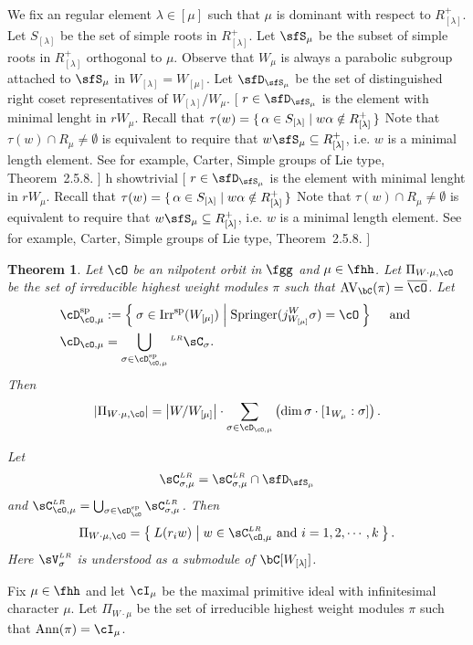 \documentclass[12pt,a4paper]{amsart}
\newcommand{\trivial}[2][]{\if\relax\detokenize{#1}\relax
  {%
      \color{orange} \vspace{0em} $[$  #2 $]$
      \color{black}
  }
  \else
\ifx#1h
\ifcsname showtrivial\endcsname
{%
    \color{orange} \vspace{0em}  $[$ #2 $]$
    \color{black}
}
\fi
\else {\red Wrong argument!} \fi
\fi
}
\newcommand{\AVC}{\mathrm{AV}_\bC}
\def\abs#1{\left|{#1}\right|}
\DeclareMathOperator{\Ann}{Ann}
\numberwithin{equation}{section}
\newtheorem{thm}{Theorem}[section]
\theoremstyle{remark}
\def\Irrsp{\mathrm{Irr}^{\text{sp}}}
\def\Wlam{W_{[\lambda]}}
\def\CLR{{\sC}^{\scriptscriptstyle LR}}
\def\LRC{{}^{\scriptscriptstyle LR}\sC}
\def\VLR{{\sV}^{\scriptscriptstyle LR}}
\def\Spr{\mathrm{Springer}}
\begin{document}
We fix an regular element $\lambda\in [\mu]$ such that $\mu$ is dominant with
respect to $R^{+}_{[\lambda]}$. Let $S_{[\lambda]}$ be the set of simple roots
in $R^{+}_{[\lambda]}$. Let $\sfS_{\mu}$ be the subset of simple roots in
$R^{+}_{[\lambda]}$ orthogonal to $\mu$. Observe that $W_{\mu}$ is always a
parabolic subgroup attached to $\sfS_{\mu}$ in $W_{[\lambda]} = W_{[\mu]}$. Let
$\sfD_{\sfS_{\mu}}$ be the set of distinguished right coset representatives of
$W_{[\lambda]}/W_{\mu}$.
\trivial[]{
  $r\in \sfD_{\sfS_{\mu}}$ is the element with minimal lenght in $rW_{\mu}$.
  Recall that $\tau(w) = \set{\alpha\in S_{[\lambda]}|w\alpha\notin R^{+}_{[\lambda]} }$
  Note that
  $\tau(w)\cap R_{\mu}\neq \emptyset$ is equivalent to require that
  $w \sfS_{\mu}\subseteq R^{+}_{[\lambda]}$, i.e. $w$ is a minimal length
  element. See for example, Carter, Simple groups of Lie type, Theorem~2.5.8.
}

\begin{thm}
  Let $\cO$ be an nilpotent orbit in $\fgg$ and $\mu\in \fhh$.
  Let $\Pi_{W\cdot \mu, \cO}$ be the set of irreducible highest
  weight modules $\pi$ such that  $\AVC(\pi) = \bcO$.
  Let
  \begin{equation}\label{eq:DC.O.mu}
    \begin{split}
      \Dsp_{\cO,\mu} &:= \Set{\sigma\in \Irrsp(W_{[\mu]})|\Spr(j_{W_{[\mu]}}^{W}\sigma) = \cO}\quad \text{
        and }\\
      \cD_{\cO,\mu} &= \bigcup_{\sigma\in \Dsp_{\cO,\mu}} \LRC_{\sigma}.
    \end{split}
  \end{equation}
  Then
  \[
    \abs{\Pi_{W\cdot\mu,\cO}} = \abs{W/W_{[\mu]}}\cdot \sum_{\sigma\in \cD_{\cO,\mu}}
    \left(\dim \sigma \cdot [1_{W_{\mu}}:\sigma]\right).
  \]


  Let
  \[
  \CLR_{\sigma,\mu} = \CLR_{\sigma,\mu}\cap \sfD_{\sfS_{\mu}}
  \]
  and $\CLR_{\cO,\mu} = \bigcup_{\sigma\in \Dsp_{\cO}} \CLR_{\sigma,\mu}$.
  Then
  \[
  \Pi_{W\cdot\mu,\cO} = \Set{L(r_{i}w)|w\in \CLR_{\cO,\mu} \text{ and } i=1,2,\cdots,k}
  .
  \]
  Here $\VLR_{\sigma}$ is understood as a submodule of $\bC[\Wlam]$.
\end{thm}


Fix $\mu\in \fhh$ and let $\cI_{\mu}$ be the maximal primitive ideal with
infinitesimal character $\mu$.
Let $\Pi_{W\cdot \mu}$ be the set of irreducible highest
weight modules $\pi$ such that  $\Ann(\pi) = \cI_{\mu}$.
\end{document}
